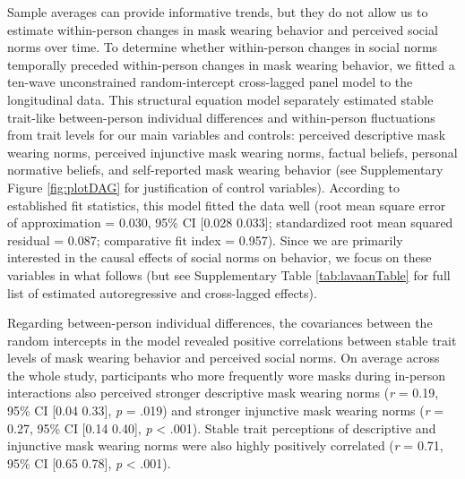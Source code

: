 \documentclass[
  man,floatsintext]{apa6}
\begin{document}
Sample averages can provide informative trends, but they do not allow us to estimate within-person changes in mask wearing behavior and perceived social norms over time. To determine whether within-person changes in social norms temporally preceded within-person changes in mask wearing behavior, we fitted a ten-wave unconstrained random-intercept cross-lagged panel model to the longitudinal data. This structural equation model separately estimated stable trait-like between-person individual differences and within-person fluctuations from trait levels for our main variables and controls: perceived descriptive mask wearing norms, perceived injunctive mask wearing norms, factual beliefs, personal normative beliefs, and self-reported mask wearing behavior (see Supplementary Figure \ref{fig:plotDAG} for justification of control variables). According to established fit statistics, this model fitted the data well (root mean square error of approximation = 0.030, 95\% CI {[}0.028 0.033{]}; standardized root mean squared residual = 0.087; comparative fit index = 0.957). Since we are primarily interested in the causal effects of social norms on behavior, we focus on these variables in what follows (but see Supplementary Table \ref{tab:lavaanTable} for full list of estimated autoregressive and cross-lagged effects).

Regarding between-person individual differences, the covariances between the random intercepts in the model revealed positive correlations between stable trait levels of mask wearing behavior and perceived social norms. On average across the whole study, participants who more frequently wore masks during in-person interactions also perceived stronger descriptive mask wearing norms (\emph{r} = 0.19, 95\% CI {[}0.04 0.33{]}, \emph{p} = .019) and stronger injunctive mask wearing norms (\emph{r} = 0.27, 95\% CI {[}0.14 0.40{]}, \emph{p} \textless{} .001). Stable trait perceptions of descriptive and injunctive mask wearing norms were also highly positively correlated (\emph{r} = 0.71, 95\% CI {[}0.65 0.78{]}, \emph{p} \textless{} .001).
\end{document}
